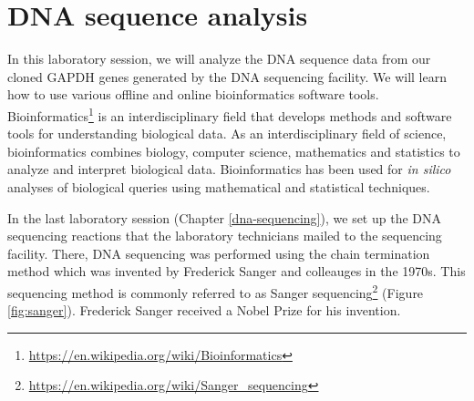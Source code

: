 \documentclass[]{book}
\let\rmarkdownfootnote\footnote%
\def\footnote{\protect\rmarkdownfootnote}
\renewcommand{\href}[2]{#2\footnote{\url{#1}}}
\theoremstyle{definition}
\theoremstyle{definition}
\theoremstyle{definition}
\theoremstyle{remark}
\begin{document}
\chapter{DNA sequence analysis}\label{dna-sequence-analysis}

In this laboratory session, we will analyze the DNA sequence data from
our cloned GAPDH genes generated by the DNA sequencing facility. We will
learn how to use various offline and online bioinformatics software
tools.
\href{https://en.wikipedia.org/wiki/Bioinformatics}{Bioinformatics} is
an interdisciplinary field that develops methods and software tools for
understanding biological data. As an interdisciplinary field of science,
bioinformatics combines biology, computer science, mathematics and
statistics to analyze and interpret biological data. Bioinformatics has
been used for \emph{in silico} analyses of biological queries using
mathematical and statistical techniques.

In the last laboratory session (Chapter \ref{dna-sequencing}), we set up
the DNA sequencing reactions that the laboratory technicians mailed to
the sequencing facility. There, DNA sequencing was performed using the
chain termination method which was invented by Frederick Sanger and
colleauges in the 1970s. This sequencing method is commonly referred to
as \href{https://en.wikipedia.org/wiki/Sanger_sequencing}{Sanger
sequencing} (Figure \ref{fig:sanger}). Frederick Sanger received a Nobel
Prize for his invention.
\end{document}
